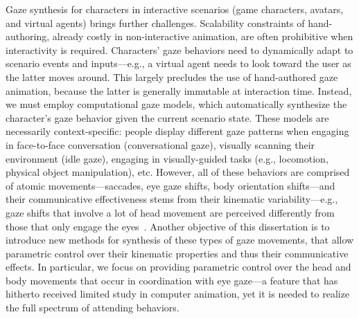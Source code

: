Gaze synthesis for characters in interactive scenarios (game characters, avatars, and virtual agents) brings further challenges. Scalability constraints of hand-authoring, already costly in non-interactive animation, are often prohibitive when interactivity is required. Characters' gaze behaviors need to dynamically adapt to scenario events and inputs---e.g., a virtual agent needs to look toward the user as the latter moves around. This largely precludes the use of hand-authored gaze animation, because the latter is generally immutable at interaction time. Instead, we must employ computational gaze models, which automatically synthesize the character's gaze behavior given the current scenario state. These models are necessarily context-specific: people display different gaze patterns when engaging in face-to-face conversation (conversational gaze), visually scanning their environment (idle gaze), engaging in visually-guided tasks (e.g., locomotion, physical object manipulation), etc.  However, all of these behaviors are comprised of atomic movements---saccades, eye gaze shifts, body orientation shifts---and their communicative effectiveness stems from their kinematic variability---e.g., gaze shifts that involve a lot of head movement are perceived differently from those that only engage the eyes~\citep{langton2000eyes}. Another objective of this dissertation is to introduce new methods for synthesis of these types of gaze movements, that allow parametric control over their kinematic properties and thus their communicative effects. In particular, we focus on providing parametric control over the head and body movements that occur in coordination with eye gaze---a feature that has hitherto received limited study in computer animation, yet it is needed to realize the full spectrum of attending behaviors.


